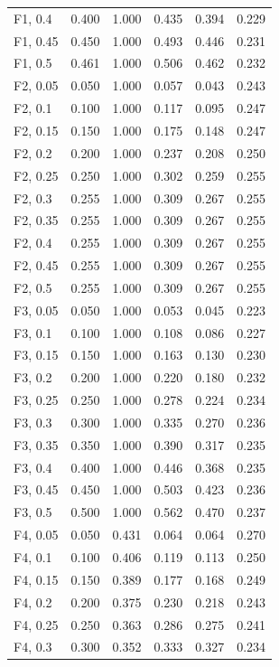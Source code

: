 \begin{longtable}{@{}lS[table-format=1.3]S[table-format=1.3]S[table-format=1.3]S[table-format=1.3]S[table-format=1.3]@{}}
F1, 0.4 & 0.400 & 1.000 & 0.435 & 0.394 & 0.229 \\
F1, 0.45 & 0.450 & 1.000 & 0.493 & 0.446 & 0.231 \\
F1, 0.5 & 0.461 & 1.000 & 0.506 & 0.462 & 0.232 \\
F2, 0.05 & 0.050 & 1.000 & 0.057 & 0.043 & 0.243 \\
F2, 0.1 & 0.100 & 1.000 & 0.117 & 0.095 & 0.247 \\
F2, 0.15 & 0.150 & 1.000 & 0.175 & 0.148 & 0.247 \\
F2, 0.2 & 0.200 & 1.000 & 0.237 & 0.208 & 0.250 \\
F2, 0.25 & 0.250 & 1.000 & 0.302 & 0.259 & 0.255 \\
F2, 0.3 & 0.255 & 1.000 & 0.309 & 0.267 & 0.255 \\
F2, 0.35 & 0.255 & 1.000 & 0.309 & 0.267 & 0.255 \\
F2, 0.4 & 0.255 & 1.000 & 0.309 & 0.267 & 0.255 \\
F2, 0.45 & 0.255 & 1.000 & 0.309 & 0.267 & 0.255 \\
F2, 0.5 & 0.255 & 1.000 & 0.309 & 0.267 & 0.255 \\
F3, 0.05 & 0.050 & 1.000 & 0.053 & 0.045 & 0.223 \\
F3, 0.1 & 0.100 & 1.000 & 0.108 & 0.086 & 0.227 \\
F3, 0.15 & 0.150 & 1.000 & 0.163 & 0.130 & 0.230 \\
F3, 0.2 & 0.200 & 1.000 & 0.220 & 0.180 & 0.232 \\
F3, 0.25 & 0.250 & 1.000 & 0.278 & 0.224 & 0.234 \\
F3, 0.3 & 0.300 & 1.000 & 0.335 & 0.270 & 0.236 \\
F3, 0.35 & 0.350 & 1.000 & 0.390 & 0.317 & 0.235 \\
F3, 0.4 & 0.400 & 1.000 & 0.446 & 0.368 & 0.235 \\
F3, 0.45 & 0.450 & 1.000 & 0.503 & 0.423 & 0.236 \\
F3, 0.5 & 0.500 & 1.000 & 0.562 & 0.470 & 0.237 \\
F4, 0.05 & 0.050 & 0.431 & 0.064 & 0.064 & 0.270 \\
F4, 0.1 & 0.100 & 0.406 & 0.119 & 0.113 & 0.250 \\
F4, 0.15 & 0.150 & 0.389 & 0.177 & 0.168 & 0.249 \\
F4, 0.2 & 0.200 & 0.375 & 0.230 & 0.218 & 0.243 \\
F4, 0.25 & 0.250 & 0.363 & 0.286 & 0.275 & 0.241 \\
F4, 0.3 & 0.300 & 0.352 & 0.333 & 0.327 & 0.234 \\

\end{longtable}
